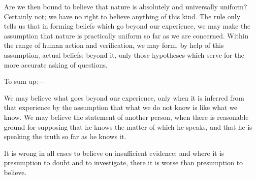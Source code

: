 \documentclass[12pt]{article}
\begin{document}
Are we then bound to believe that nature is absolutely and universally uniform? Certainly not; we have no right to believe anything of this kind. The rule only tells us that in forming beliefs which go beyond our experience, we may make the assumption that nature is practically uniform so far as we are concerned. Within the range of human action and verification, we may form, by help of this assumption, actual beliefs; beyond it, only those hypotheses which serve for the more accurate asking of questions.

To sum up:---

We may believe what goes beyond our experience, only when it is inferred from that experience by the assumption that what we do not know is like what we know. We may believe the statement of another person, when there is reasonable ground for supposing that he knows the matter of which he speaks, and that he is speaking the truth so far as he knows it.

It is wrong in all cases to believe on insufficient evidence; and where it is presumption to doubt and to investigate, there it is worse than presumption to believe.


\label{theend}
\end{document}
